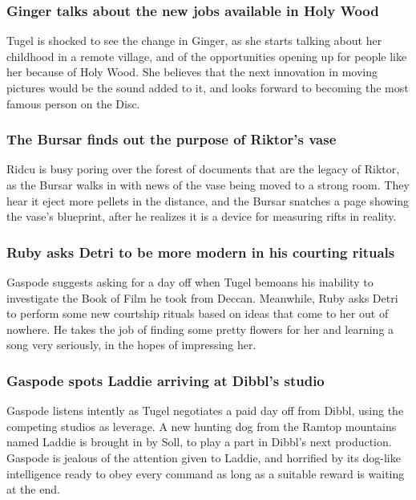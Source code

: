 \subsubsection{\Gls{Ginger} talks about the new jobs available in Holy Wood}
\Gls{Tugel} is shocked to see the change in \Gls{Ginger}, as she starts talking about her
childhood in a remote village, and of the opportunities opening up for people like her because of
Holy Wood. She believes that the next innovation in moving pictures would be the sound added to it,
and looks forward to becoming the most famous person on the Disc.

\subsubsection{The \Gls{Bursar} finds out the purpose of \Gls{Riktor}'s vase}
\Gls{Ridcu} is busy poring over the forest of documents that are the legacy of \Gls{Riktor}, as
the \Gls{Bursar} walks in with news of the vase being moved to a strong room. They hear it eject
more pellets in the distance, and the \Gls{Bursar} snatches a page showing the vase's blueprint,
after he realizes it is a device for measuring rifts in reality.

\subsubsection{\Gls{Ruby} asks \Gls{Detri} to be more modern in his courting rituals}
\Gls{Gaspode} suggests asking for a day off when \Gls{Tugel} bemoans his inability to investigate
the Book of Film he took from \Gls{Deccan}. Meanwhile, \Gls{Ruby} asks \Gls{Detri} to perform some
new courtship rituals based on ideas that come to her out of nowhere. He takes the job of finding
some pretty flowers for her and learning a song very seriously, in the hopes of impressing her.

\subsubsection{\Gls{Gaspode} spots \Gls{Laddie} arriving at \Gls{Dibbl}'s studio}
\Gls{Gaspode} listens intently as \Gls{Tugel} negotiates a paid day off from \Gls{Dibbl}, using the
competing studios as leverage. A new hunting dog from the Ramtop mountains named \Gls{Laddie} is
brought in by \Gls{Soll}, to play a part in \Gls{Dibbl}'s next production. \Gls{Gaspode} is
jealous of the attention given to \Gls{Laddie}, and horrified by its dog-like intelligence ready to
obey every command as long as a suitable reward is waiting at the end.

